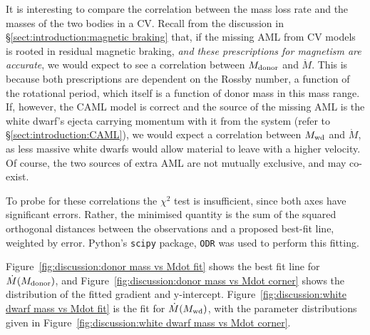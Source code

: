 It is interesting to compare the correlation between the mass loss rate and the masses of the two bodies in a CV.
Recall from the discussion in \S\ref{sect:introduction:magnetic braking} that, if the missing AML from CV models is rooted in residual magnetic braking, {\it and these prescriptions for magnetism are accurate}, we would expect to see a correlation between $M_{\rm donor}$ and $\dot M$.
This is because both prescriptions are dependent on the Rossby number, a function of the rotational period, which itself is a function of donor mass in this mass range.
If, however, the CAML model is correct and the source of the missing AML is the white dwarf's ejecta carrying momentum with it from the system (refer to \S\ref{sect:introduction:CAML}), we would expect a correlation between $M_{\rm wd}$ and $\dot M$, as less massive white dwarfs would allow material to leave with a higher velocity. Of course, the two sources of extra AML are not mutually exclusive, and may co-exist.

To probe for these correlations the $\chi^2$ test is insufficient, since both axes have significant errors.
Rather, the minimised quantity is the sum of the squared orthogonal distances between the observations and a proposed best-fit line, weighted by error. Python's \lstinline{scipy} package, \lstinline{ODR} was used to perform this fitting.

Figure~\ref{fig:discussion:donor mass vs Mdot fit} shows the best fit line for $\dot M(M_{\rm donor})$, and Figure~\ref{fig:discussion:donor mass vs Mdot corner} shows the distribution of the fitted gradient and y-intercept. Figure~\ref{fig:discussion:white dwarf mass vs Mdot fit} is the fit for $\dot M(M_{\rm wd})$, with the parameter distributions given in Figure~\ref{fig:discussion:white dwarf mass vs Mdot corner}.

